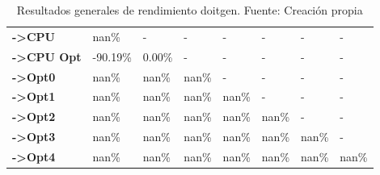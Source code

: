 \begin{table}[H]
\begin{tabular}{llllllll}
    \rowcolor[HTML]{EFEFEF} \cellcolor[HTML]{DAE8FC} \textbf{->CPU} & nan\% & - & - & - & - & - & - \\
    \cellcolor[HTML]{DAE8FC} \textbf{->CPU Opt} & -90.19\% & 0.00\% & - & - & - & - & - \\
    \rowcolor[HTML]{EFEFEF} \cellcolor[HTML]{DAE8FC} \textbf{->Opt0} & nan\% & nan\% & nan\% & - & - & - & - \\
    \cellcolor[HTML]{DAE8FC} \textbf{->Opt1} & nan\% & nan\% & nan\% & nan\% & - & - & - \\
    \rowcolor[HTML]{EFEFEF} \cellcolor[HTML]{DAE8FC} \textbf{->Opt2} & nan\% & nan\% & nan\% & nan\% & nan\% & - & - \\
    \cellcolor[HTML]{DAE8FC} \textbf{->Opt3} & nan\% & nan\% & nan\% & nan\% & nan\% & 	nan\% & - \\
    \rowcolor[HTML]{EFEFEF} \cellcolor[HTML]{DAE8FC} \textbf{->Opt4} & nan\% & nan\% & nan\% & nan\% & nan\% & 	nan\% & 	nan\% \\
    \end{tabular}
    \caption[Resultados generales de rendimiento doitgen]{{Resultados generales de rendimiento doitgen. Fuente: Creación propia}}
    \label{table_global_doitgen_PerformanceResults_speedup}
\end{table}